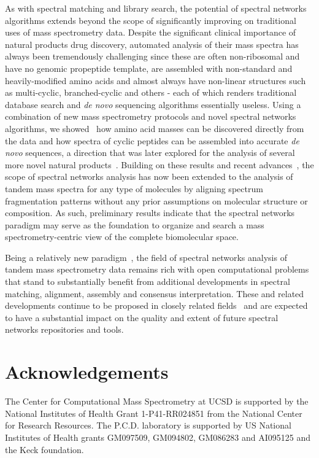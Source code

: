 \documentclass[8.5pt,twoside,twocolumn]{article}
\begin{document}
As with spectral matching and library search, the potential of spectral networks algorithms extends beyond the scope of significantly improving on traditional uses of mass spectrometry data. Despite the significant clinical importance of natural products drug discovery, automated analysis of their mass spectra has always been tremendously challenging since these are often non-ribosomal and have no genomic propeptide template, are assembled with non-standard and heavily-modified amino acids and almost always have non-linear structures such as multi-cyclic, branched-cyclic and others - each of which renders traditional database search and {\em de novo} sequencing algorithms essentially useless. Using a combination of new mass spectrometry protocols and novel spectral networks algorithms, we showed~\cite{bandeira08recomb} how amino acid masses can be discovered directly from the data and how spectra of cyclic peptides can be assembled into accurate {\em de novo} sequences, a direction that was later explored for the analysis of several more novel natural products~\cite{liu09,ng09}. Building on these results and recent advances~\cite{watrous12}, the scope of spectral networks analysis has now been extended to the analysis of tandem mass spectra for any type of molecules by aligning spectrum fragmentation patterns without any prior assumptions on molecular structure or composition. As such, preliminary results indicate that the spectral networks paradigm may serve as the foundation to organize and search a mass spectrometry-centric view of the complete biomolecular space.

Being a relatively new paradigm~\cite{bandeira04,bandeira07pnas,bandeira07mcp}, the field of spectral networks analysis of tandem mass spectrometry data remains rich with open computational problems that stand to substantially benefit from additional developments in spectral matching, alignment, assembly and consensus interpretation. These and related developments continue to be proposed in closely related fields~\cite{wang10,yen11,lam11} and are expected to have a substantial impact on the quality and extent of future spectral networks repositories and tools.

\section*{Acknowledgements}

The Center for Computational Mass Spectrometry at UCSD is supported by the National Institutes of Health Grant 1-P41-RR024851 from the National Center for Research Resources. The P.C.D. laboratory is supported by US National Institutes of Health grants GM097509, GM094802, GM086283 and AI095125 and the Keck foundation.

\footnotesize{

}
\end{document}
